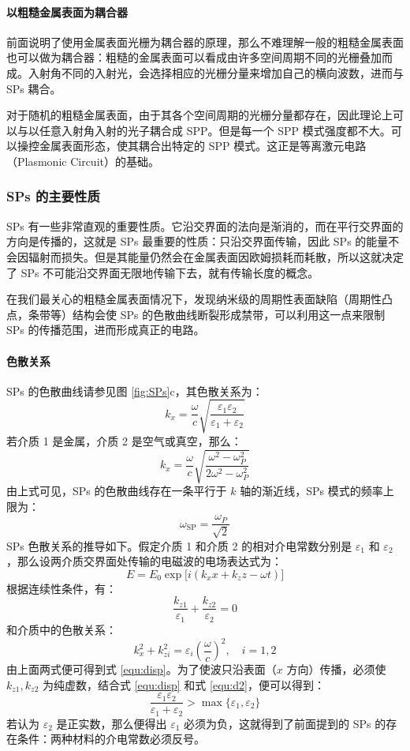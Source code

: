 \paragraph{以粗糙金属表面为耦合器}
前面说明了使用金属表面光栅为耦合器的原理，那么不难理解一般的粗糙金属表面也可以做为耦合器：粗糙的金属表面可以看成由许多空间周期不同的光栅叠加而成。入射角不同的入射光，会选择相应的光栅分量来增加自己的横向波数，进而与 SPs 耦合。

对于随机的粗糙金属表面，由于其各个空间周期的光栅分量都存在，因此理论上可以与以任意入射角入射的光子耦合成 SPP。但是每一个 SPP 模式强度都不大。可以操控金属表面形态，使其耦合出特定的 SPP 模式。这正是等离激元电路（Plasmonic Circuit）的基础。

\subsubsection{SPs 的主要性质}
SPs 有一些非常直观的重要性质。它沿交界面的法向是渐消的，而在平行交界面的方向是传播的，这就是 SPs 最重要的性质：只沿交界面传输，因此 SPs 的能量不会因辐射而损失。但是其能量仍然会在金属表面因欧姆损耗而耗散，所以这就决定了 SPs 不可能沿交界面无限地传输下去，就有传输长度的概念。

在我们最关心的粗糙金属表面情况下，发现纳米级的周期性表面缺陷（周期性凸点，条带等）结构会使 SPs 的色散曲线断裂形成禁带，可以利用这一点来限制 SPs 的传播范围，进而形成真正的电路。

\paragraph{色散关系}
SPs 的色散曲线请参见图 \ref{fig:SPs}c，其色散关系为：
\begin{equation}
\label{equ:disp}
k_x = \dfrac{\omega}{c}\sqrt{\dfrac{\phantom{|}\varepsilon_1\varepsilon_2\phantom{|}}{\varepsilon_1+\varepsilon_2}}
\end{equation}
若介质 1 是金属，介质 2 是空气或真空，那么：
\[
	k_x = \dfrac{\omega}{c}\sqrt{\dfrac{\omega^2-\omega_P^2}{2\omega^2-\omega_P^2}}
\]
由上式可见，SPs 的色散曲线存在一条平行于 $k$ 轴的渐近线，SPs 模式的频率上限为：
\[
	\omega_{\text{SP}}=\dfrac{\omega_P}{\sqrt{2}}
\]
SPs 色散关系的推导如下。假定介质 1 和介质 2 的相对介电常数分别是 $\varepsilon_1$ 和
 $\varepsilon_2$，那么设两介质交界面处传输的电磁波的电场表达式为：
\[
	E = E_0\exp\big[i(k_xx+k_zz-\omega t)\big]
\]
根据连续性条件，有：
\begin{equation}
\label{equ:c1}
\dfrac{k_{z1}}{\varepsilon_1} + \dfrac{k_{z2}}{\varepsilon_2} = 0
\end{equation}
和介质中的色散关系：
\begin{equation}
\label{equ:d2}
k_x^2 + k_{zi}^2 = \varepsilon_i\left(\dfrac{\omega}{c}\right)^2,\quad i=1,2
\end{equation}
由上面两式便可得到式 \ref{equ:disp}。为了使波只沿表面（$x$ 方向）传播，必须使 $k_{z1},k_{z2}$ 为纯虚数，结合式 \ref{equ:disp} 和式 \ref{equ:d2}，便可以得到：
\[
	\dfrac{\varepsilon_1\varepsilon_2}{\varepsilon_1+\varepsilon_2} > \max\{\varepsilon_1, \varepsilon_2\}
\]
若认为 $\varepsilon_2$ 是正实数，那么便得出 $\varepsilon_1$ 必须为负，这就得到了前面提到的 SPs 的存在条件：两种材料的介电常数必须反号。

